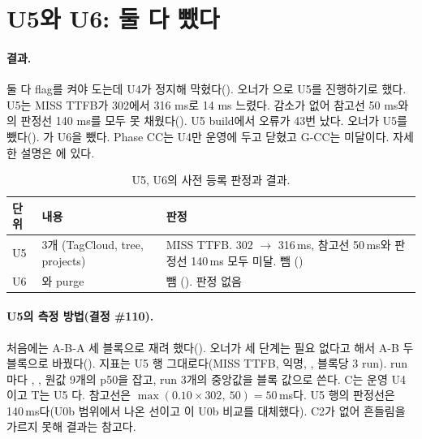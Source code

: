 \section{U5와 U6: 둘 다 뺐다}\label{sec:re-u56}

\paragraph{결과.}
둘 다 flag를 켜야 도는데 U4가 정지해 막혔다(). 오너가 으로 U5를 진행하기로 했다.
U5는 MISS TTFB가 302에서 316 ms로 14 ms 느렸다. 감소가 없어 참고선 50 ms와 의 판정선 140 ms를 모두 못 채웠다().
U5 build에서  오류가 43번 났다. 오너가 U5를 뺐다().
가 U6을 뺐다. Phase CC는 U4만 운영에 두고 닫혔고 G-CC는 미달이다.
자세한 설명은 에 있다.
\begin{table}[H]
  \caption{U5, U6의 사전 등록 판정과 결과.}
  \label{tab:re-u56}
  \centering\small
  \begin{tabularx}{\linewidth}{@{}L{1.2cm} Y L{3.6cm}@{}}
    \toprule
    단위 & 내용 & 판정 \\
    \midrule
    U5 &  3개 (TagCloud, tree, projects) & MISS TTFB. 302 $\to$ 316\,ms, 참고선 50\,ms와 판정선 140\,ms 모두 미달. 뺌 () \\
    \midrule
    U6 & 와 purge & 뺌 (). 판정 없음 \\
    \bottomrule
  \end{tabularx}
\end{table}

\paragraph{U5의 측정 방법(결정 \#110).}
처음에는 A-B-A 세 블록으로 재려 했다(). 오너가 세 단계는 필요 없다고 해서 A-B 두 블록으로 바꿨다().
지표는  U5 행 그대로다(MISS TTFB, 익명, , 블록당 3 run).
run마다 \code{/}, ,  원값 9개의 p50을 잡고, run 3개의 중앙값을 블록 값으로 쓴다.
C는 운영 U4 이고 T는 U5 다.
참고선은 $\max(0.10\times 302,\ 50)=50$\,ms다.  U5 행의 판정선은 140\,ms다(U0b 범위에서 나온 선이고 이 U0b 비교를 대체했다).
C2가 없어 흔들림을 가르지 못해 결과는 참고다.

